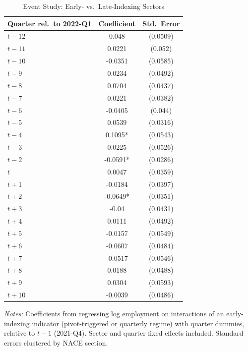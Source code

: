\begin{table}[t]
\centering
\caption{Event Study: Early- vs.\ Late-Indexing Sectors}
\label{tab:event}
\begin{tabular}{lcc}
\hline\hline
Quarter rel.\ to 2022-Q1 & Coefficient & Std.\ Error \\
\hline
$t-12$ & 0.048 & (0.0509) \\
$t-11$ & 0.0221 & (0.052) \\
$t-10$ & -0.0351 & (0.0585) \\
$t-9$ & 0.0234 & (0.0492) \\
$t-8$ & 0.0704 & (0.0437) \\
$t-7$ & 0.0221 & (0.0382) \\
$t-6$ & -0.0405 & (0.044) \\
$t-5$ & 0.0539 & (0.0316) \\
$t-4$ & 0.1095* & (0.0543) \\
$t-3$ & 0.0225 & (0.0526) \\
$t-2$ & -0.0591* & (0.0286) \\
$t$ & 0.0047 & (0.0359) \\
$t+1$ & -0.0184 & (0.0397) \\
$t+2$ & -0.0649* & (0.0351) \\
$t+3$ & -0.04 & (0.0431) \\
$t+4$ & 0.0111 & (0.0492) \\
$t+5$ & -0.0157 & (0.0549) \\
$t+6$ & -0.0607 & (0.0484) \\
$t+7$ & -0.0517 & (0.0546) \\
$t+8$ & 0.0188 & (0.0488) \\
$t+9$ & 0.0304 & (0.0593) \\
$t+10$ & -0.0039 & (0.0486) \\
\hline\hline
\end{tabular}
\begin{tablenotes}[flushleft]
\small
\item \textit{Notes:} Coefficients from regressing log employment on interactions of an early-indexing indicator (pivot-triggered or quarterly regime) with quarter dummies, relative to $t-1$ (2021-Q4). Sector and quarter fixed effects included. Standard errors clustered by NACE section.
\end{tablenotes}
\end{table}
